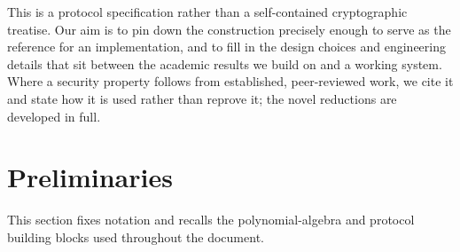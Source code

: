 \documentclass{article}
\theoremstyle{definition}
\begin{document}
This is a protocol specification rather than a self-contained cryptographic treatise. Our aim is to pin down the construction precisely enough to serve as the reference for an implementation, and to fill in the design choices and engineering details that sit between the academic results we build on and a working system. Where a security property follows from established, peer-reviewed work, we cite it and state how it is used rather than reprove it; the novel reductions are developed in full.

\section{Preliminaries}
\label{sec:preliminaries}
\label{sec:notation}

This section fixes notation and recalls the polynomial-algebra and protocol building blocks used throughout the document.
\end{document}
